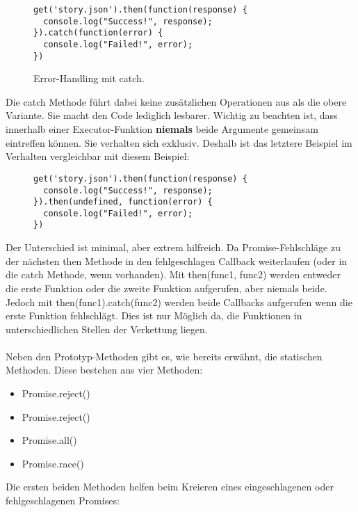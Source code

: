 \begin{figure}[H]
\begin{lstlisting}
get('story.json').then(function(response) {
  console.log("Success!", response);
}).catch(function(error) {
  console.log("Failed!", error);
})
\end{lstlisting}
\caption{Error-Handling mit catch. \cite{callback-vs-promises}}
\end{figure}

\noindent
Die catch Methode führt dabei keine zusätzlichen Operationen aus als die obere Variante. Sie macht den Code lediglich lesbarer. Wichtig zu beachten ist, dass innerhalb einer Executor-Funktion \textbf{niemals} beide Argumente gemeinsam eintreffen können. Sie verhalten sich exklusiv. Deshalb ist das letztere Beispiel im Verhalten vergleichbar mit diesem Beispiel:

\begin{figure}[H]
\begin{lstlisting}
get('story.json').then(function(response) {
  console.log("Success!", response);
}).then(undefined, function(error) {
  console.log("Failed!", error);
})
\end{lstlisting}
\end{figure}

\noindent
Der Unterschied ist minimal, aber extrem hilfreich. Da Promise-Fehlschläge zu der nächsten then Methode in den fehlgeschlagen Callback weiterlaufen (oder in die catch Methode, wenn vorhanden). Mit then(func1, func2) werden entweder die erste Funktion oder die zweite Funktion aufgerufen, aber niemals beide. Jedoch mit then(func1).catch(func2) werden beide Callbacks aufgerufen wenn die erste Funktion fehlschlägt. Dies ist nur Möglich da, die Funktionen in unterschiedlichen Stellen der Verkettung liegen.\\\\

\noindent
Neben den Prototyp-Methoden gibt es, wie bereits erwähnt, die statischen Methoden. Diese bestehen aus vier Methoden:

\begin{itemize}
\item Promise.reject()
\item Promise.reject()
\item Promise.all()
\item Promise.race() 
\end{itemize}

Die ersten beiden Methoden helfen beim Kreieren eines eingeschlagenen oder fehlgeschlagenen Promises:

